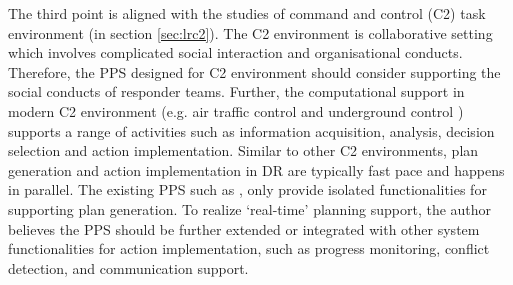 The third point is aligned with the studies of command and control (C2) task environment (in section \ref{sec:lrc2}). The C2 environment is collaborative setting which involves complicated social interaction and organisational conducts. Therefore, the PPS designed for C2 environment should consider supporting the social conducts of responder teams. Further, the computational support in modern C2 environment (e.g. air traffic control \cite{Mercer2014} and underground control \cite{Sharples2011}) supports a range of activities such as information acquisition, analysis, decision selection and action implementation. Similar to other C2 environments, plan generation and action implementation in DR are typically fast pace and happens in parallel. The existing PPS such as \cite{IntergraphCorporation2000}, \cite{Eglese1994} only provide isolated functionalities for supporting plan generation. To realize `real-time' planning support, the author believes the PPS should be further extended or integrated with other system functionalities for action implementation, such as progress monitoring, conflict detection, and communication support.\\


